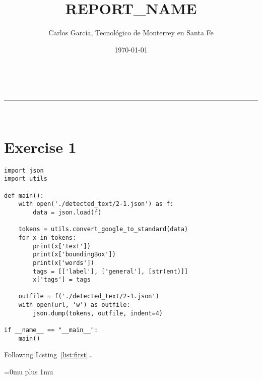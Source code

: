 \documentclass[12pt]{article}
\makeatletter
\newcommand\fileName{REPORT\_NAME}
\newcommand{\linia}{\rule{\linewidth}{0.5pt}}
\renewcommand{\maketitle}{
\begin{center}
\vspace{2ex}
{\huge \textsc{\@title}}
\vspace{1ex}
\\
\linia\\
\@author \hfill \@date
\vspace{4ex}
\end{center}
}
\makeatother
\begin{document}
\title{\fileName}

\author{Carlos García, Tecnol\'ogico de Monterrey en Santa Fe}

\date{\today}

\maketitle

\section*{Exercise 1}
\begin{lstlisting}[label={list:first},caption=Python -- Script using spaCy.]
import json
import utils

def main():
    with open('./detected_text/2-1.json') as f:
        data = json.load(f)

    tokens = utils.convert_google_to_standard(data)
    for x in tokens:
        print(x['text'])
        print(x['boundingBox'])
        print(x['words'])
        tags = [['label'], ['general'], [str(ent)]]
        x['tags'] = tags

    outfile = f('./detected_text/2-1.json')
    with open(url, 'w') as outfile:
        json.dump(tokens, outfile, indent=4)

if __name__ == "__main__":
    main()
\end{lstlisting}

Following Listing~\ref{list:first}\ldots{} \cite{Lu2020Dec}

\Urlmuskip=0mu plus 1mu\relax


\end{document}

